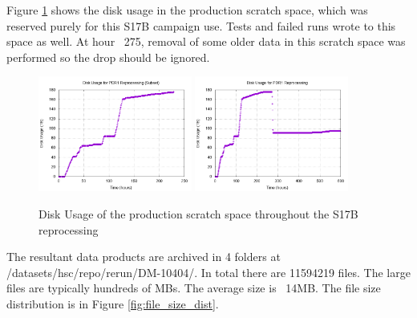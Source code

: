 \documentclass[DM,authoryear,toc]{lsstdoc}
\begin{document}
Figure \ref{fig:df} shows the disk usage in the production scratch space, which was reserved purely for this S17B campaign use. Tests and failed runs wrote to this space as well.  At hour ~275, removal of some older data in this scratch space was performed so the drop should be ignored.
\begin{figure}[htbp]
        \begin{center}
                 \includegraphics[width=0.45\textwidth]{figures/df_focus}
                 \includegraphics[width=0.45\textwidth]{figures/df}
                 \caption{Disk Usage of the production scratch space throughout the S17B reprocessing}
                 \label{fig:df}
        \end{center}
\end{figure}

The resultant data products are archived in 4 folders at /datasets/hsc/repo/rerun/DM-10404/. In total there are 11594219 files. The large files are typically hundreds of MBs.  The average size is ~14MB. The file size distribution is in Figure \ref{fig:file_size_dist}.
\end{document}

